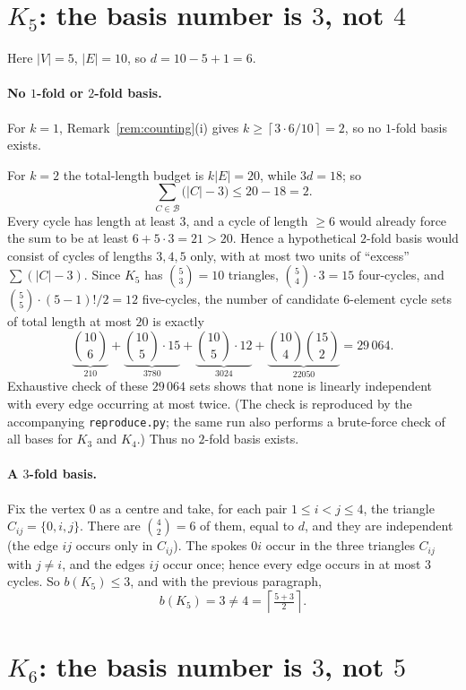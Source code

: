 \documentclass[11pt]{article}
\theoremstyle{definition}
\theoremstyle{remark}
\newcommand{\ceil}[1]{\left\lceil #1 \right\rceil}
\begin{document}
\section{$K_5$: the basis number is $3$, not $4$}

Here $|V|=5$, $|E|=10$, so $d=10-5+1=6$.

\paragraph{No $1$-fold or $2$-fold basis.}
For $k=1$, Remark~\ref{rem:counting}(i) gives
$k\ge \ceil{3\cdot 6/10} = 2$, so no $1$-fold basis exists.

For $k=2$ the total-length budget is $k|E| = 20$, while $3d=18$; so
\[
  \sum_{C\in\mathcal{B}}\bigl(|C|-3\bigr) \le 20-18 = 2 .
\]
Every cycle has length at least $3$, and a cycle of length $\ge 6$ would
already force the sum to be at least $6+5\cdot 3 = 21>20$. Hence a
hypothetical $2$-fold basis would consist of cycles of lengths $3,4,5$ only,
with at most two units of ``excess'' $\sum(|C|-3)$. Since $K_5$ has
$\binom{5}{3}=10$ triangles, $\binom{5}{4}\cdot 3 = 15$ four-cycles, and
$\binom{5}{5}\cdot(5-1)!/2 = 12$ five-cycles, the number of candidate
$6$-element cycle sets of total length at most $20$ is exactly
\[
  \underbrace{\binom{10}{6}}_{210}
  +\underbrace{\binom{10}{5}\cdot 15}_{3780}
  +\underbrace{\binom{10}{5}\cdot 12}_{3024}
  +\underbrace{\binom{10}{4}\binom{15}{2}}_{22050}
  = 29\,064 .
\]
Exhaustive check of these $29\,064$ sets shows that none is linearly
independent with every edge occurring at most twice. (The check is reproduced
by the accompanying \texttt{reproduce.py}; the same run also performs a
brute-force check of all bases for $K_3$ and $K_4$.) Thus no $2$-fold basis
exists.

\paragraph{A $3$-fold basis.}
Fix the vertex $0$ as a centre and take, for each pair $1\le i<j\le 4$, the
triangle $C_{ij}=\{0,i,j\}$. There are $\binom{4}{2}=6$ of them, equal to
$d$, and they are independent (the edge $ij$ occurs only in $C_{ij}$). The
spokes $0i$ occur in the three triangles $C_{ij}$ with $j\ne i$, and the edges
$ij$ occur once; hence every edge occurs in at most $3$ cycles. So
$b(K_5)\le 3$, and with the previous paragraph,
\[
  b(K_5)=3 \neq 4 = \ceil{\tfrac{5+3}{2}}.
\]

\section{$K_6$: the basis number is $3$, not $5$}
\end{document}
